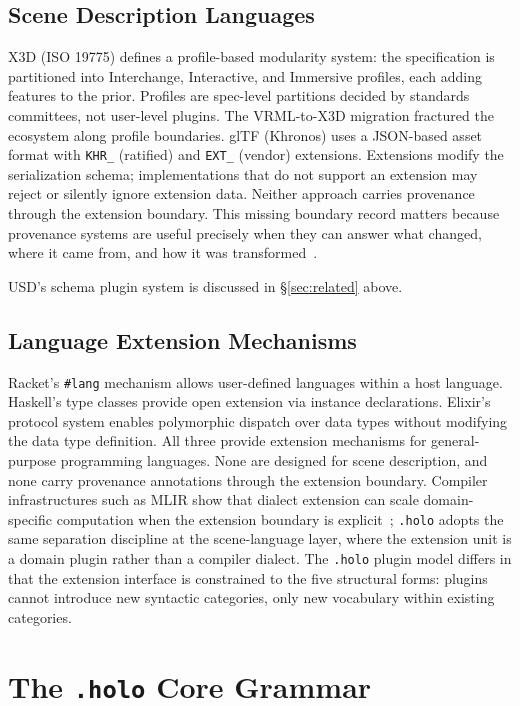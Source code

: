 \documentclass[sigconf,nonacm]{acmart}
\newcommand{\holo}{\texttt{.holo}}
\begin{document}
\subsection{Scene Description Languages}
X3D (ISO 19775) defines a profile-based modularity system:
the specification is partitioned into Interchange, Interactive,
and Immersive profiles, each adding features to the prior.
Profiles are spec-level partitions decided by standards
committees, not user-level plugins. The VRML-to-X3D
migration fractured the ecosystem along profile boundaries.
glTF (Khronos) uses a JSON-based asset format with
\texttt{KHR\_} (ratified) and \texttt{EXT\_} (vendor)
extensions. Extensions modify the serialization schema;
implementations that do not support an extension may reject
or silently ignore extension data. Neither approach carries
provenance through the extension boundary.
This missing boundary record matters because provenance systems are
useful precisely when they can answer what changed, where it came
from, and how it was transformed~\cite{w3c-prov,Herschel2017}.

USD's schema plugin system is discussed in
\S\ref{sec:related} above.

\subsection{Language Extension Mechanisms}
Racket's \texttt{\#lang} mechanism allows user-defined
languages within a host language. Haskell's type classes
provide open extension via instance declarations. Elixir's
protocol system enables polymorphic dispatch over data types
without modifying the data type definition. All three
provide extension mechanisms for general-purpose programming
languages. None are designed for scene description, and none
carry provenance annotations through the extension boundary.
Compiler infrastructures such as MLIR show that dialect extension can
scale domain-specific computation when the extension boundary is
explicit~\cite{mlir-lattner2020}; \holo{} adopts the same separation
discipline at the scene-language layer, where the extension unit is a
domain plugin rather than a compiler dialect.
The \holo{} plugin model differs in that the extension
interface is constrained to the five structural forms:
plugins cannot introduce new syntactic categories, only new
vocabulary within existing categories.

\section{The \holo{} Core Grammar}
\label{sec:grammar}
\end{document}
